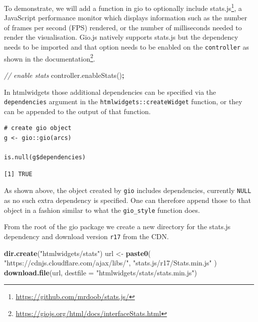 \documentclass[
]{krantz}
\makeatletter
\newenvironment{Shaded}{\begin{snugshade}}{\end{snugshade}}
\newcommand{\AttributeTok}[1]{\textcolor[rgb]{0.61,0.61,0.61}{#1}}
\newcommand{\CommentTok}[1]{\textcolor[rgb]{0.37,0.37,0.37}{\textit{#1}}}
\newcommand{\DataTypeTok}[1]{\textcolor[rgb]{0.27,0.27,0.27}{#1}}
\newcommand{\KeywordTok}[1]{\textcolor[rgb]{0.27,0.27,0.27}{\textbf{#1}}}
\newcommand{\NormalTok}[1]{#1}
\newcommand{\OperatorTok}[1]{\textcolor[rgb]{0.43,0.43,0.43}{\textbf{#1}}}
\newcommand{\StringTok}[1]{\textcolor[rgb]{0.5,0.5,0.5}{#1}}
\newcommand{\VariableTok}[1]{\textcolor[rgb]{0,0,0}{#1}}
\renewcommand{\href}[2]{#2\footnote{\url{#1}}}
\newenvironment{kframe}{%
\medskip{}
\setlength{\fboxsep}{.8em}
 \def\at@end@of@kframe{}%
 \ifinner\ifhmode%
  \def\at@end@of@kframe{\end{minipage}}%
  \begin{minipage}{\columnwidth}%
 \fi\fi%
 \def\FrameCommand##1{\hskip\@totalleftmargin \hskip-\fboxsep
 \colorbox{shadecolor}{##1}\hskip-\fboxsep
     \hskip-\linewidth \hskip-\@totalleftmargin \hskip\columnwidth}%
 \MakeFramed {\advance\hsize-\width
   \@totalleftmargin\z@ \linewidth\hsize
   \@setminipage}}%
 {\par\unskip\endMakeFramed%
 \at@end@of@kframe}
\renewenvironment{Shaded}{\begin{kframe}}{\end{kframe}}
\makeatother
\begin{document}
To demonstrate, we will add a function in gio to optionally include \href{https://github.com/mrdoob/stats.js/}{stats.js}, a JavaScript performance monitor which displays information such as the number of frames per second (FPS) rendered, or the number of milliseconds needed to render the visualisation. Gio.js natively supports stats.js but the dependency needs to be imported and that option needs to be enabled on the \texttt{controller} as shown in the \href{https://giojs.org/html/docs/interfaceStats.html}{documentation}.

\begin{Shaded}
\begin{Highlighting}[]
\CommentTok{// enable stats}
\VariableTok{controller}\NormalTok{.}\AttributeTok{enableStats}\NormalTok{()}\OperatorTok{;}
\end{Highlighting}
\end{Shaded}

In htmlwidgets those additional dependencies can be specified via the \texttt{dependencies} argument in the \texttt{htmlwidgets::createWidget} function, or they can be appended to the output of that function.

\begin{verbatim}
# create gio object
g <- gio::gio(arcs)

is.null(g$dependencies)
\end{verbatim}

\begin{verbatim}
[1] TRUE
\end{verbatim}

As shown above, the object created by \texttt{gio} includes dependencies, currently \texttt{NULL} as no such extra dependency is specified. One can therefore append those to that object in a fashion similar to what the \texttt{gio\_style} function does.

From the root of the gio package we create a new directory for the stats.js dependency and download version \texttt{r17} from the CDN.

\begin{Shaded}
\begin{Highlighting}[]
\KeywordTok{dir.create}\NormalTok{(}\StringTok{"htmlwidgets/stats"}\NormalTok{)}
\NormalTok{url <{-}}\StringTok{ }\KeywordTok{paste0}\NormalTok{(}
  \StringTok{"https://cdnjs.cloudflare.com/ajax/libs/"}\NormalTok{,}
  \StringTok{"stats.js/r17/Stats.min.js"}
\NormalTok{)}
\KeywordTok{download.file}\NormalTok{(url, }\DataTypeTok{destfile =} \StringTok{"htmlwidgets/stats/stats.min.js"}\NormalTok{)}
\end{Highlighting}
\end{Shaded}
\end{document}
